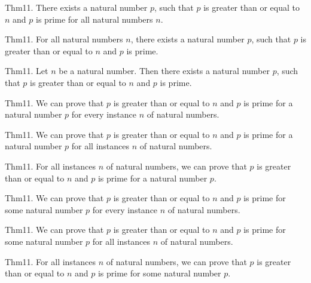 \documentclass{article}
\begin{document}
Thm11. There exists a natural number $p$, such that $p$ is greater than or equal to $n$ and $p$ is prime for all natural numbers $n$.

Thm11. For all natural numbers $n$, there exists a natural number $p$, such that $p$ is greater than or equal to $n$ and $p$ is prime.

Thm11. Let $n$ be a natural number. Then there exists a natural number $p$, such that $p$ is greater than or equal to $n$ and $p$ is prime.

Thm11. We can prove that $p$ is greater than or equal to $n$ and $p$ is prime for a natural number $p$ for every instance $n$ of natural numbers.

Thm11. We can prove that $p$ is greater than or equal to $n$ and $p$ is prime for a natural number $p$ for all instances $n$ of natural numbers.

Thm11. For all instances $n$ of natural numbers, we can prove that $p$ is greater than or equal to $n$ and $p$ is prime for a natural number $p$.

Thm11. We can prove that $p$ is greater than or equal to $n$ and $p$ is prime for some natural number $p$ for every instance $n$ of natural numbers.

Thm11. We can prove that $p$ is greater than or equal to $n$ and $p$ is prime for some natural number $p$ for all instances $n$ of natural numbers.

Thm11. For all instances $n$ of natural numbers, we can prove that $p$ is greater than or equal to $n$ and $p$ is prime for some natural number $p$.
\end{document}
